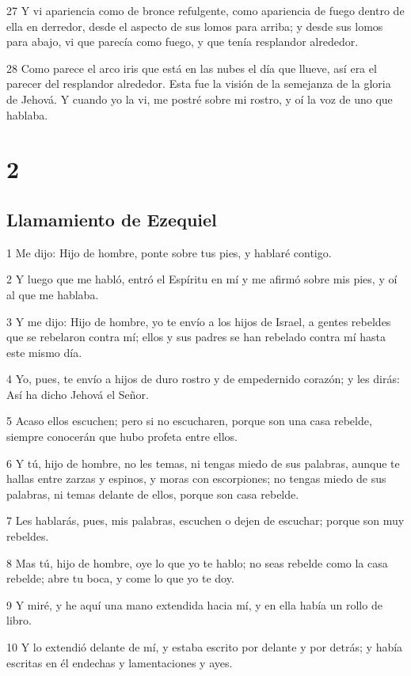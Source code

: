 \par 27 Y vi apariencia como de bronce refulgente, como apariencia de fuego dentro de ella en derredor, desde el aspecto de sus lomos para arriba; y desde sus lomos para abajo, vi que parecía como fuego, y que tenía resplandor alrededor.
\par 28 Como parece el arco iris que está en las nubes el día que llueve, así era el parecer del resplandor alrededor. Esta fue la visión de la semejanza de la gloria de Jehová. Y cuando yo la vi, me postré sobre mi rostro, y oí la voz de uno que hablaba.

\chapter{2}

\section*{Llamamiento de Ezequiel}

\par 1 Me dijo: Hijo de hombre, ponte sobre tus pies, y hablaré contigo.
\par 2 Y luego que me habló, entró el Espíritu en mí y me afirmó sobre mis pies, y oí al que me hablaba.
\par 3 Y me dijo: Hijo de hombre, yo te envío a los hijos de Israel, a gentes rebeldes que se rebelaron contra mí; ellos y sus padres se han rebelado contra mí hasta este mismo día.
\par 4 Yo, pues, te envío a hijos de duro rostro y de empedernido corazón; y les dirás: Así ha dicho Jehová el Señor.
\par 5 Acaso ellos escuchen; pero si no escucharen, porque son una casa rebelde, siempre conocerán que hubo profeta entre ellos.
\par 6 Y tú, hijo de hombre, no les temas, ni tengas miedo de sus palabras, aunque te hallas entre zarzas y espinos, y moras con escorpiones; no tengas miedo de sus palabras, ni temas delante de ellos, porque son casa rebelde.
\par 7 Les hablarás, pues, mis palabras, escuchen o dejen de escuchar; porque son muy rebeldes.
\par 8 Mas tú, hijo de hombre, oye lo que yo te hablo; no seas rebelde como la casa rebelde; abre tu boca, y come lo que yo te doy.
\par 9 Y miré, y he aquí una mano extendida hacia mí, y en ella había un rollo de libro.
\par 10 Y lo extendió delante de mí, y estaba escrito por delante y por detrás; y había escritas en él endechas y lamentaciones y ayes.

